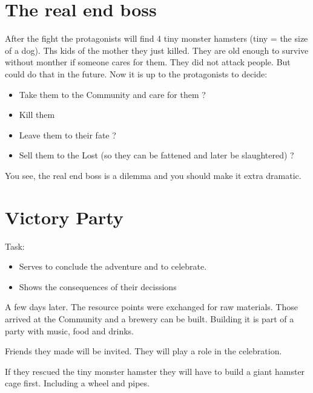 \section{The real end boss}

After the fight the protagonists will find 4 tiny monster hamsters (tiny = the size of a dog). Ths kids of the mother they just killed. They are old enough to survive without monther if someone cares for them. They did not attack people. But could do that in the future. Now it is up to the protagonists to decide:

\begin{itemize}
    \item Take them to the Community and care for them ?
    \item Kill them
    \item Leave them to their fate ?
    \item Sell them to the Lost (so they can be fattened and later be slaughtered) ?
\end{itemize}

You see, the real end boss is a dilemma and you should make it extra dramatic.

\section{Victory Party}

Task:

\begin{itemize}
\item Serves to conclude the adventure and to celebrate.
\item Shows the consequences of their decissions
\end{itemize}
A few days later. The resource points were exchanged for raw materials. Those arrived at the Community and a brewery can be built. Building it is part of a party with music, food and drinks.

Friends they made will be invited. They will play a role in the celebration.

If they rescued the tiny monster hamster they will have to build a giant hamster cage first. Including a wheel and pipes.